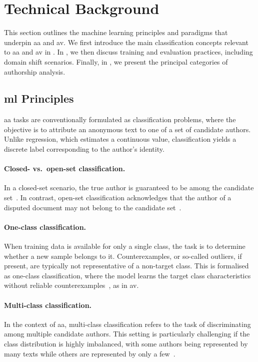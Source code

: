 \section{Technical Background}
\label{sec:technical_background}

This section outlines the machine learning principles and paradigms that underpin \ac{aa} and \ac{av}. 
We first introduce the main classification concepts relevant to \ac{aa} and \ac{av} in . 
In , we then discuss training and evaluation practices, including domain shift scenarios. 
Finally, in , we present the principal categories of authorship analysis.

\subsection{\acl{ml} Principles}
\label{subsec:ml_principles}

\ac{aa} tasks are conventionally formulated as classification problems, where the objective is to attribute an anonymous text to one of a set of candidate authors. 
Unlike regression, which estimates a continuous value, classification yields a discrete label corresponding to the author’s identity.

\paragraph{Closed- vs.\ open-set classification.} 
In a closed-set scenario, the true author is guaranteed to be among the candidate set~\citep{koppel_authorship_2011}. 
In contrast, open-set classification acknowledges that the author of a disputed document may not belong to the candidate set~\citep{stamatatos_survey_2009}. 

\paragraph{One-class classification.} 
When training data is available for only a single class, the task is to determine whether a new sample belongs to it. 
Counterexamples, or so-called outliers, if present, are typically not representative of a non-target class. 
This is formalised as one-class classification, where the model learns the target class characteristics without reliable counterexamples~\citep{stein_intrinsic_2011,koppel_authorship_2004}, as in \ac{av}.

\paragraph{Multi-class classification.} 
In the context of \ac{aa}, multi-class classification refers to the task of discriminating among multiple candidate authors. 
This setting is particularly challenging if the class distribution is highly imbalanced, with some authors being represented by many texts while others are represented by only a few~\citep{stamatatos_survey_2009,koppel_authorship_2004}. 


